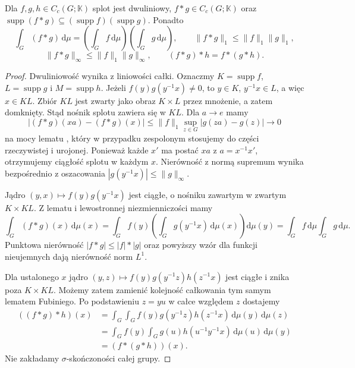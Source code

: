 \begin{twierdzenie}
\label{thm:dt-haar-convolution}
Dla $f,g,h\in C_c(G;\mathbb K)$ splot jest
dwuliniowy, $f*g\in C_c(G;\mathbb K)$ oraz
$\operatorname{supp}(f*g)\subseteq
(\operatorname{supp}f)(\operatorname{supp}g)$.
Ponadto
\[
 \int_G(f*g)\,\mathrm d\mu
 =\left(\int_G f\,\mathrm d\mu\right)
  \left(\int_G g\,\mathrm d\mu\right),
 \qquad
 \|f*g\|_1\le\|f\|_1\|g\|_1,
\]
\[
 \|f*g\|_\infty\le\|f\|_1\|g\|_\infty,\qquad
 (f*g)*h=f*(g*h).
\]
\end{twierdzenie}
\begin{proof}
Dwuliniowość wynika z liniowości całki.
Oznaczmy $K=\operatorname{supp}f$,
$L=\operatorname{supp}g$ i $M=\operatorname{supp}h$.
Jeżeli $f(y)g(y^{-1}x)\ne0$, to $y\in K$,
$y^{-1}x\in L$, a więc $x\in KL$. Zbiór $KL$
jest zwarty jako obraz $K\times L$ przez mnożenie,
a zatem domknięty. Stąd nośnik splotu zawiera się
w $KL$. Dla $a\to e$ mamy
\[
 |(f*g)(xa)-(f*g)(x)|
 \le\|f\|_1\sup_{z\in G}|g(za)-g(z)|\longrightarrow0
\]
na mocy lematu ,
który w przypadku zespolonym stosujemy do części
rzeczywistej i urojonej. Ponieważ każde $x'$
ma postać $xa$ z $a=x^{-1}x'$, otrzymujemy
ciągłość splotu w każdym $x$.
Nierówność z normą supremum wynika bezpośrednio
z oszacowania $|g(y^{-1}x)|\le\|g\|_\infty$.

Jądro $(y,x)\mapsto f(y)g(y^{-1}x)$ jest ciągłe,
o nośniku zawartym w zwartym $K\times KL$.
Z lematu 
i lewostronnej niezmienniczości mamy
\[
 \int_G(f*g)(x)\,\mathrm d\mu(x)
 =\int_G f(y)\left(\int_G g(y^{-1}x)
                 \,\mathrm d\mu(x)\right)\mathrm d\mu(y)
 =\int_G f\,\mathrm d\mu\int_G g\,\mathrm d\mu.
\]
Punktowa nierówność $|f*g|\le |f|*|g|$ oraz
powyższy wzór dla funkcji nieujemnych dają
nierówność norm $L^1$.

Dla ustalonego $x$ jądro
$(y,z)\mapsto f(y)g(y^{-1}z)h(z^{-1}x)$
jest ciągłe i znika poza $K\times KL$.
Możemy zatem zamienić kolejność całkowania
tym samym lematem Fubiniego. Po podstawieniu
$z=yu$ w całce względem $z$ dostajemy
\begin{align*}
 ((f*g)*h)(x)
 &=\int_G\int_G f(y)g(y^{-1}z)h(z^{-1}x)
       \,\mathrm d\mu(y)\,\mathrm d\mu(z)\\
 &=\int_G f(y)\int_G g(u)h(u^{-1}y^{-1}x)
       \,\mathrm d\mu(u)\,\mathrm d\mu(y)\\
 &= (f*(g*h))(x).
\end{align*}
Nie zakładamy $\sigma$-skończoności całej grupy.
\end{proof}

